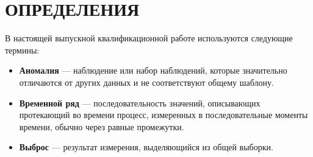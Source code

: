 
\chapter*{\hfill{\centering ОПРЕДЕЛЕНИЯ}\hfill}
В настоящей выпускной квалификационной работе используются следующие термины:
\begin{itemize}
	\item \textbf{Аномалия} --- наблюдение или набор наблюдений, которые значительно отличаются от других данных и не соответствуют общему шаблону.
	\item \textbf{Временной ряд} --- последовательность значений, описывающих протекающий во времени процесс, измеренных в последовательные моменты времени, обычно через равные промежутки.
	\item \textbf{Выброс} --- результат измерения, выделяющийся из общей выборки.
\end{itemize}


